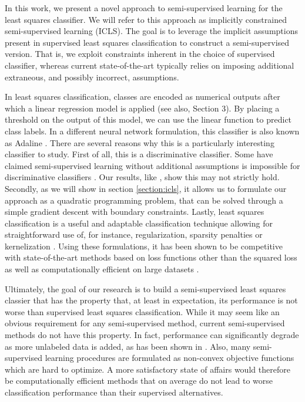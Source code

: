 \documentclass[smallcondensed]{svjour3}
\begin{document}
In this work, we present a novel approach to semi-supervised learning for the least squares classifier. We will refer to this approach as implicitly constrained semi-supervised learning (ICLS). The goal is to leverage the implicit assumptions present in supervised least squares classification to construct a semi-supervised version. That is, we exploit constraints inherent in the choice of supervised classifier, whereas current state-of-the-art typically relies on imposing additional extraneous, and possibly incorrect, assumptions.

In least squares classification, classes are encoded as numerical outputs after which a linear regression model is applied (see also, Section 3). By placing a threshold on the output of this model, we can use the linear function to predict class labels. In a different neural network formulation, this classifier is also known as Adaline \cite{Widrow1960}. There are several reasons why this is a particularly interesting classifier to study. First of all, this is a discriminative classifier. Some have claimed semi-supervised learning without additional assumptions is impossible for discriminative classifiers \cite{Seeger2001}. Our results, like \cite{Sokolovska2008}, show this may not strictly hold. Secondly, as we will show in section \ref{section:icls}, it allows us to formulate our approach as a quadratic programming problem, that can be solved through a simple gradient descent with boundary constraints. Lastly, least squares classification is a useful and adaptable classification technique  allowing for straightforward use of, for instance, regularization, sparsity penalties or kernelization \cite{Hastie2001,Rifkin2003,Tibshirani1996,Poggio2003}. Using these formulations, it has been shown to be competitive with state-of-the-art methods based on loss functions other than the squared loss \cite{Rifkin2003} as well as computationally efficient on large datasets \cite{Bottou2010}.

Ultimately, the goal of our research is to build a semi-supervised least squares classier that has the property that, at least in expectation, its performance is not worse than supervised least squares classification. While it may seem like an obvious requirement for any semi-supervised method, current semi-supervised methods do not have this property. In fact, performance can significantly degrade as more unlabeled data is added, as has been shown in \cite{Cozman2006}. Also, many semi-supervised learning procedures are formulated as non-convex objective functions which are hard to optimize. A more satisfactory state of affairs would therefore be computationally efficient methods that on average do not lead to worse classification performance than their supervised alternatives.
\end{document}
